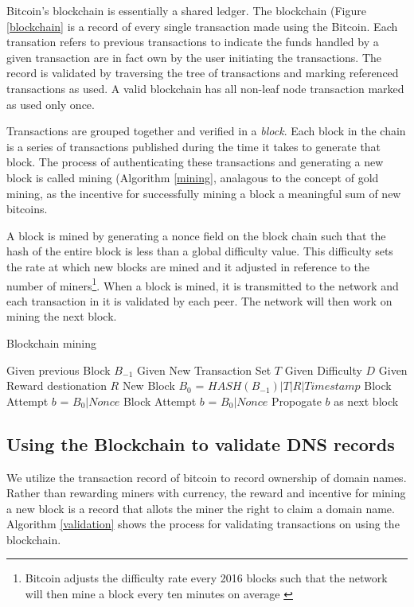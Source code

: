 \documentclass[11pt]{IEEEtran} %
\begin{document}
Bitcoin's blockchain is essentially a shared ledger.  The blockchain (Figure \ref{blockchain} is a record of every single transaction made using the Bitcoin. Each transation refers to previous transactions to indicate the funds handled by a given transaction are in fact own by the user initiating the transactions. The record is validated by traversing the tree of transactions and marking referenced transactions as used. A valid blockchain has all non-leaf node transaction marked as used only once.



Transactions are grouped together and verified in a \emph{block}.  Each block in the chain is a series of transactions published during the time it takes to generate that block. The process of authenticating these transactions and generating a new block is called mining (Algorithm \ref{mining}, analagous to the concept of gold mining, as the incentive for successfully mining a block a meaningful sum of new bitcoins.  

A block is mined by generating a nonce field on the block chain such that the hash of the entire block is less than a global difficulty value. This difficulty sets the rate at which new blocks are mined and it adjusted in reference to the number of miners\footnote{Bitcoin adjusts the difficulty rate every 2016 blocks such that the network will then mine a block every ten minutes on average \cite{bitdiff}}.  When a block is mined, it is transmitted to the network and each transaction in it is validated by each peer. The network will then work on mining the next block.

\begin{algorithm}
\caption{Blockchain mining}
\label{mining}
\begin{algorithmic}[1]  %
\STATE Given previous Block $B_{-1}$
\STATE Given New Transaction Set $T$
\STATE Given Difficulty $D$
\STATE Given Reward destionation $R$
\STATE New Block $B_0$ = $HASH(B_{-1})|T|R|Timestamp$
\STATE Block Attempt $b$ = $B_0|Nonce$
	\STATE Block Attempt $b$ = $B_0|Nonce$
\ENDWHILE
\STATE Propogate $b$ as next block
\end{algorithmic}
\end{algorithm}


\subsection{Using the Blockchain to validate DNS records}
We utilize the transaction record of bitcoin to record ownership of domain names. Rather than rewarding miners with currency,  the reward and incentive for mining a new block is a record that allots the miner the right to claim a domain name.  Algorithm \ref{validation} shows the process for validating transactions on using the blockchain.
\end{document}

